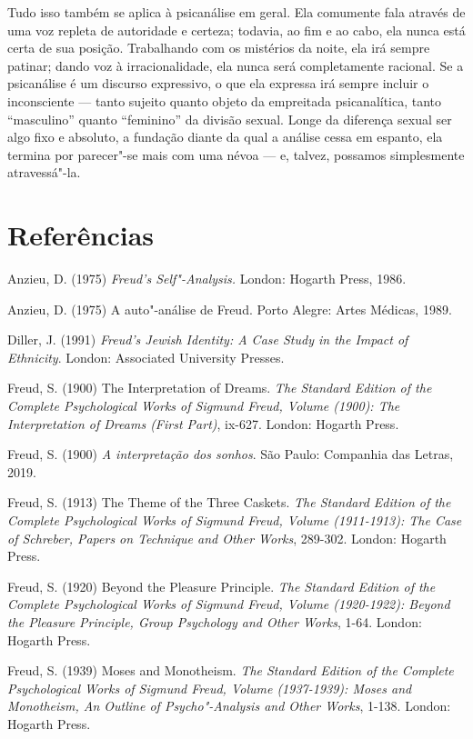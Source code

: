 Tudo isso também se aplica à psicanálise em geral. Ela comumente fala
através de uma voz repleta de autoridade e certeza; todavia, ao fim e ao
cabo, ela nunca está certa de sua posição. Trabalhando com os mistérios
da noite, ela irá sempre patinar; dando voz à irracionalidade, ela nunca
será completamente racional. Se a psicanálise é um discurso expressivo,
o que ela expressa irá sempre incluir o inconsciente --- tanto sujeito
quanto objeto da empreitada psicanalítica, tanto ``masculino'' quanto
``feminino'' da divisão sexual. Longe da diferença sexual ser algo fixo
e absoluto, a fundação diante da qual a análise cessa em espanto, ela
termina por parecer"-se mais com uma névoa --- e, talvez, possamos
simplesmente atravessá"-la.

\section{Referências}

Anzieu, D. (1975) \emph{Freud's Self"-Analysis.} London: Hogarth Press,
1986.

Anzieu, D. (1975) A auto"-análise de Freud. Porto Alegre: Artes Médicas,
1989.

Diller, J. (1991) \emph{Freud's Jewish Identity: A Case Study in the
Impact of Ethnicity}. London: Associated University Presses.

Freud, S. (1900) The Interpretation of Dreams. \emph{The Standard
Edition of the Complete Psychological Works of Sigmund Freud, Volume 
(1900): The Interpretation of Dreams (First Part)}, ix-627. London:
Hogarth Press.

Freud, S. (1900) \emph{A interpretação dos sonhos}. São Paulo: Companhia
das Letras, 2019.

Freud, S. (1913) The Theme of the Three Caskets. \emph{The Standard
Edition of the Complete Psychological Works of Sigmund Freud, Volume 
(1911-1913): The Case of Schreber, Papers on Technique and Other Works},
289-302. London: Hogarth Press.

Freud, S. (1920) Beyond the Pleasure Principle. \emph{The Standard
Edition of the Complete Psychological Works of Sigmund Freud, Volume
 (1920-1922): Beyond the Pleasure Principle, Group Psychology and
Other Works}, 1-64. London: Hogarth Press.

Freud, S. (1939) Moses and Monotheism. \emph{The Standard Edition of the
Complete Psychological Works of Sigmund Freud, Volume  (1937-1939):
Moses and Monotheism, An Outline of Psycho"-Analysis and Other Works},
1-138. London: Hogarth Press.

